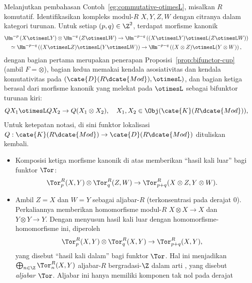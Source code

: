 \begin{contoh}
	Melanjutkan pembahasan Contoh~\ref{eg:commutative-otimesL}, misalkan $R$
	komutatif. Identifikasikan kompleks modul-$R$ $X,Y,Z,W$ dengan citranya
	dalam kategori turunan. Untuk setiap $(p,q)\in\Z^2$, terdapat morfisme
	kanonik
	\begin{multline*}
		\Hm^{-p}\left( X \otimesL Y \right) \otimes \Hm^{-q}\left( Z \otimesL W \right) \to \Hm^{-p-q}\left( (X \otimesL Y) \otimesL (Z \otimesL W) \right) \\
		\simeq \Hm^{-p-q}\left( (X \otimesL Z) \otimesL (Y \otimesL W) \right) \to \Hm^{-p-q} \left( (X \otimes Z) \otimesL (Y \otimes W) \right),
	\end{multline*}
	dengan bagian pertama merupakan penerapan Proposisi~\ref{prop:bifunctor-cup}
	(ambil $F=\otimes$), bagian kedua memakai kendala asosiativitas dan
	kendala komutativitas pada $(\cate{D}(R\dcate{Mod}),\otimesL)$, dan
	bagian ketiga berasal dari morfisme kanonik yang melekat pada $\otimesL$
	sebagai bifunktor turunan kiri:
	\[ QX_1 \otimesL QX_2 \to Q(X_1 \otimes X_2), \quad X_1, X_2 \in \Obj(\cate{K}(R\dcate{Mod})), \]
	Untuk ketepatan notasi, di sini funktor lokalisasi
	$Q:\cate{K}(R\dcate{Mod})\to\cate{D}(R\dcate{Mod})$ dituliskan kembali.
	\begin{itemize}
		\item Komposisi ketiga morfisme kanonik di atas memberikan ``hasil kali
		luar'' bagi funktor $\Tor$:
		\[ \Tor^R_p(X, Y) \otimes \Tor^R_q(Z, W) \to \Tor^R_{p+q}(X \otimes Z, Y \otimes W). \]
		\item Ambil $Z=X$ dan $W=Y$ sebagai aljabar-$R$ (terkonsentrasi pada
		derajat $0$). Perkaliannya memberikan homomorfisme modul-$R$
		$X\otimes X\to X$ dan $Y\otimes Y\to Y$. Dengan menyusun hasil kali
		luar dengan homomorfisme-homomorfisme ini, diperoleh
		\[ \Tor^R_p(X, Y) \otimes \Tor^R_q(X, Y) \to \Tor^R_{p+q}(X,Y), \]
		yang disebut ``hasil kali dalam'' bagi funktor $\Tor$. Hal ini menjadikan
		$\bigoplus_{n \in \Z} \Tor^R_n(X, Y)$ aljabar-$R$ bergradasi-$\Z$
		dalam arti \cite[Definisi 7.4.1]{Li1}, yang disebut \emph{aljabar
		$\Tor$}. Aljabar ini hanya memiliki komponen tak nol pada derajat

\end{itemize}
\end{contoh}
